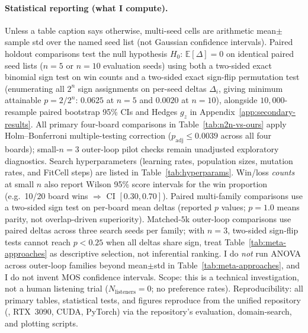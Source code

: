 \paragraph{Statistical reporting (what I compute).}
Unless a table caption says otherwise, multi-seed cells are arithmetic mean$\pm$sample std over the named seed list (not Gaussian confidence intervals).
Paired holdout comparisons test the null hypothesis $H_0{:}\,\mathbb{E}[\Delta]{=}0$ on identical paired seed lists ($n{=}5$ or $n{=}10$ evaluation seeds) using both a two-sided exact binomial sign test on win counts and a two-sided exact sign-flip permutation test (enumerating all $2^n$ sign assignments on per-seed deltas $\Delta_i$, giving minimum attainable $p{=}2/2^n$: $0.0625$ at $n{=}5$ and $0.0020$ at $n{=}10$), alongside $10{,}000$-resample paired bootstrap 95\% CIs and Hedges $g_z$ in Appendix~\ref{app:secondary-results}.
All primary four-board comparisons in Table~\ref{tab:n2n-vs-ours} apply Holm--Bonferroni multiple-testing correction ($p_{\mathrm{adj}}{\le}0.0039$ across all four boards); small-$n{=}3$ outer-loop pilot checks remain unadjusted exploratory diagnostics.
Search hyperparameters (learning rates, population sizes, mutation rates, and FitCell steps) are listed in Table~\ref{tab:hyperparams}.
Win/loss \emph{counts} at small $n$ also report Wilson 95\% score intervals for the win proportion (e.g.\ 10/20 board wins $\Rightarrow$ CI $[0.30,0.70]$).
Paired multi-family comparisons use a two-sided sign test on per-board mean deltas (reported $p$ values; $p{=}1.0$ means parity, not overlap-driven superiority).
Matched-$5$k outer-loop comparisons use paired deltas across three search seeds per family; with $n{=}3$, two-sided sign-flip tests cannot reach $p<0.25$ when all deltas share sign, treat Table~\ref{tab:meta-approaches} as descriptive selection, not inferential ranking.
I do \emph{not} run ANOVA across outer-loop families beyond mean$\pm$std in Table~\ref{tab:meta-approaches}, and I do not invent MOS confidence intervals.
Scope: this is a technical investigation, not a human listening trial ($N_{\mathrm{listeners}}{=}0$; no preference rates).
Reproducibility: all primary tables, statistical tests, and figures reproduce from the unified repository (, RTX~3090, CUDA, PyTorch) via the repository's evaluation, domain-search, and plotting scripts.

